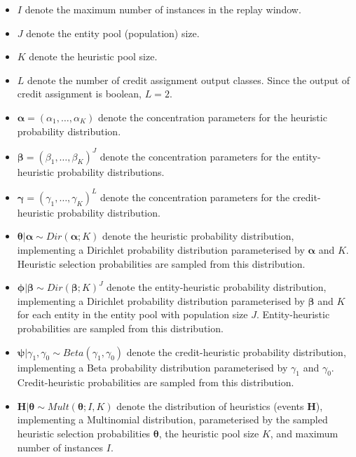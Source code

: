 \begin{itemize}
      \item $I$ denote the maximum number of instances in the replay window.
      \item $J$ denote the entity pool (population) size.
      \item $K$ denote the heuristic pool size.
      \item $L$ denote the number of credit assignment output classes. Since the output of credit assignment is boolean, $L = 2$.

      \item $\boldsymbol{\alpha} = (\alpha_{1}, \dots, \alpha_{K})$ denote the concentration parameters for the heuristic probability distribution.
      \item $\boldsymbol{\beta} = (\beta_{1}, \dots, \beta_{K})^{J}$ denote the concentration parameters for the entity-heuristic probability distributions.
      \item $\boldsymbol{\gamma} = (\gamma_{1}, \dots, \gamma_{K})^{L}$ denote the concentration parameters for the credit-heuristic probability distribution.

      \item $\boldsymbol{\theta} \vert \boldsymbol{\alpha} \sim Dir(\boldsymbol{\alpha}; K)$ denote the heuristic probability distribution, implementing a Dirichlet probability distribution parameterised by $\boldsymbol{\alpha}$ and $K$. Heuristic selection probabilities are sampled from this distribution.

      \item $\boldsymbol{\phi} \vert \boldsymbol{\beta} \sim Dir(\boldsymbol{\beta}; K)^{J}$ denote the entity-heuristic probability distribution, implementing a Dirichlet probability distribution parameterised by $\boldsymbol{\beta}$ and $K$ for each entity in the entity pool with population size $J$. Entity-heuristic probabilities are sampled from this distribution.

      \item $\boldsymbol{\psi} \vert \gamma_{1}, \gamma_{0}  \sim Beta(\gamma_{1}, \gamma_{0})$ denote the credit-heuristic probability distribution, implementing a Beta probability distribution parameterised by $\gamma_{1}$ and $\gamma_{0}$. Credit-heuristic probabilities are sampled from this distribution.

      \item $\boldsymbol{H} \vert \boldsymbol{\theta} \sim Mult(\boldsymbol{\theta}; I, K)$ denote the distribution of heuristics (events $\boldsymbol{H}$), implementing a Multinomial distribution, parameterised by the sampled heuristic selection probabilities $\boldsymbol{\theta}$, the heuristic pool size $K$, and maximum number of instances $I$.


\end{itemize}
